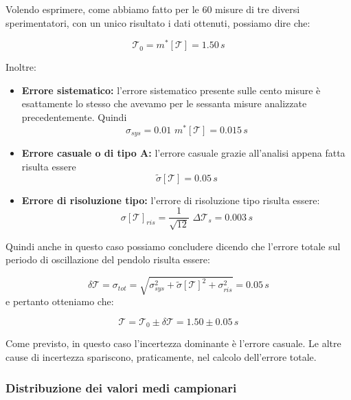 Volendo esprimere, come abbiamo fatto per le 60 misure di tre diversi sperimentatori,
con un unico risultato i dati ottenuti, possiamo dire che:

\begin{equation*}
	\mathcal{T}_0 = m^*[\mathcal{T}] = 1.50 \,s
\end{equation*}

Inoltre:

\begin{itemize}
	\item{\textbf{Errore sistematico:} l'errore sistematico presente sulle cento misure è esattamente lo stesso che avevamo per le sessanta misure analizzate precedentemente. Quindi 
		\begin{equation*}
			\sigma_{sys} = 0.01\,\,m^*[\mathcal{T}] = 0.015\,s
		\end{equation*}	 }
	\item{\textbf{Errore casuale o di tipo A:} l'errore casuale grazie all'analisi appena fatta risulta essere
		\begin{equation*}
			\tilde{\sigma}[\mathcal{T}] = 0.05\,s
		\end{equation*}}
	\item{\textbf{Errore di risoluzione tipo:} l'errore di risoluzione tipo risulta essere:
		\begin{equation*}
			 {\sigma}[\mathcal{T}]_{ris} = \frac{1}{\sqrt{12}} \,\, \Delta\mathcal{T}_{s} = 0.003\,s	
		\end{equation*}}
\end{itemize}

Quindi anche in questo caso possiamo concludere dicendo che l'errore totale sul periodo di oscillazione del pendolo risulta essere:

\begin{equation*}
	\delta\mathcal{T} = \sigma_{tot} = \sqrt{\sigma_{sys}^2 + \tilde{\sigma}[\mathcal{T}]^2 + \sigma_{ris}^2} = 0.05 \,s
\end{equation*}
e pertanto otteniamo che:

\begin{equation}
	\mathcal{T} = \mathcal{T}_0 \pm \delta\mathcal{T} = 1.50 \pm 0.05\,s
\end{equation}

Come previsto, in questo caso l'incertezza dominante è l'errore casuale.
Le altre cause di incertezza spariscono, praticamente, nel calcolo dell'errore totale. 

\subsubsection{Distribuzione dei valori medi campionari}

